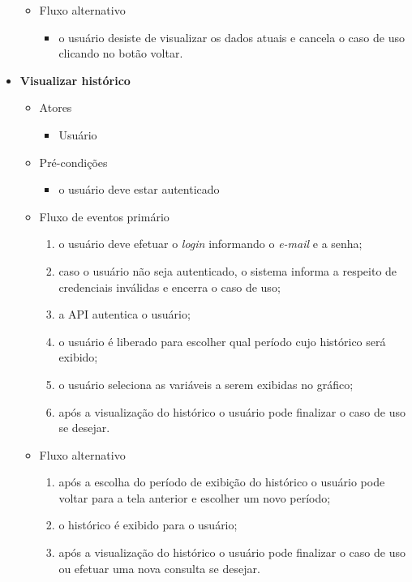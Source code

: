 \begin{itemize}
\begin{itemize}
    		\item Fluxo alternativo
			    \begin{itemize}
    			   \item o usuário desiste de visualizar os dados atuais e cancela o caso de uso clicando no botão voltar.
			    \end{itemize}

		\end{itemize}

	\item \textbf{Visualizar histórico}

		\begin{itemize}
		    \item Atores
	    		\begin{itemize}
		    	    \item Usuário
	    		\end{itemize}

	    	\item Pré-condições
    			\begin{itemize}
			        \item o usuário deve estar autenticado
			    \end{itemize}

		    \item Fluxo de eventos primário
			    \begin{enumerate}
			        \item o usuário deve efetuar o \textit{login} informando o \textit{e-mail} e a senha;
			        \item caso o usuário não seja autenticado, o sistema informa a respeito de credenciais inválidas e encerra o caso de uso;
			        \item a API autentica o usuário;
			        \item o usuário é liberado para escolher qual período cujo histórico será exibido;
			        \item o usuário seleciona as variáveis a serem exibidas no gráfico;
			        \item após a visualização do histórico o usuário pode finalizar o caso de uso se desejar.
			    \end{enumerate}

		    \item Fluxo alternativo
			    \begin{enumerate}
			        \item após a escolha do período de exibição do histórico o usuário pode voltar para a tela anterior e escolher um novo período;
			        \item o histórico é exibido para o usuário;
			        \item após a visualização do histórico o usuário pode finalizar o caso de uso ou efetuar uma nova consulta se desejar.
			    \end{enumerate}


\end{itemize}
\end{itemize}
